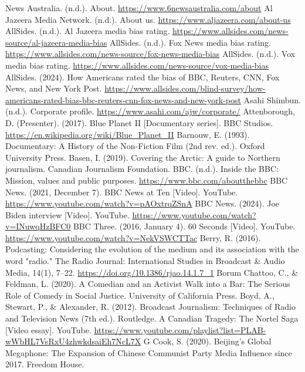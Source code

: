 
\begin{referencelist}
   News Australia. (n.d.). About. \url{https://www.6newsaustralia.com/about}
   Al Jazeera Media Network. (n.d.). About us. \url{https://www.aljazeera.com/about-us}
   AllSides. (n.d.). Al Jazeera media bias rating. \url{https://www.allsides.com/news-source/al-jazeera-media-bias}
   AllSides. (n.d.). Fox News media bias rating. \url{https://www.allsides.com/news-source/fox-news-media-bias}
   AllSides. (n.d.). Vox media bias rating. \url{https://www.allsides.com/news-source/vox-media-bias}
   AllSides. (2024). How Americans rated the bias of BBC, Reuters, CNN, Fox News, and New York Post. \url{https://www.allsides.com/blind-survey/how-americans-rated-bias-bbc-reuters-cnn-fox-news-and-new-york-post}
   Asahi Shimbun. (n.d.). Corporate profile. \url{https://www.asahi.com/ajw/corporate/}
   Attenborough, D. (Presenter). (2017). Blue Planet II [Documentary series]. BBC Studios. \url{https://en.wikipedia.org/wiki/Blue_Planet_II}
   Barnouw, E. (1993). Documentary: A History of the Non-Fiction Film (2nd rev. ed.). Oxford University Press.
   Basen, I. (2019). Covering the Arctic: A guide to Northern journalism. Canadian Journalism Foundation.
   BBC. (n.d.). Inside the BBC: Mission, values and public purposes. \url{https://www.bbc.com/aboutthebbc}
   BBC News. (2021, December 7). BBC News at Ten [Video]. YouTube. \url{https://www.youtube.com/watch?v=pAOxtrqZSnA}
   BBC News. (2024). Joe Biden interview [Video]. YouTube. \url{https://www.youtube.com/watch?v=INuwqHzBFC0}
   BBC Three. (2016, January 4). 60 Seconds [Video]. YouTube. \url{https://www.youtube.com/watch?v=NekVSWCTTac}
   Berry, R. (2016). Podcasting: Considering the evolution of the medium and its association with the word "radio." The Radio Journal: International Studies in Broadcast \& Audio Media, 14(1), 7–22. \url{https://doi.org/10.1386/rjao.14.1.7_1}
   Borum Chattoo, C., \& Feldman, L. (2020). A Comedian and an Activist Walk into a Bar: The Serious Role of Comedy in Social Justice. University of California Press.
   Boyd, A., Stewart, P., \& Alexander, R. (2012). Broadcast Journalism: Techniques of Radio and Television News (7th ed.). Routledge. A Canadian Tragedy: The Nortel Saga [Video essay]. YouTube. \url{https://www.youtube.com/playlist?list=PLAB-wWbHL7VsRxU4zhwkdsaiEh7NcL7X} G
   Cook, S. (2020). Beijing's Global Megaphone: The Expansion of Chinese Communist Party Media Influence since 2017. Freedom House.

\end{referencelist}
